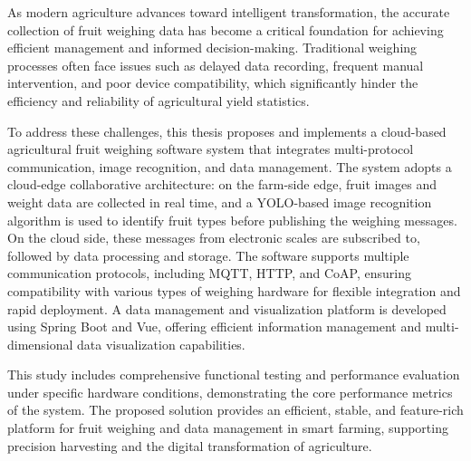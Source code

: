 As modern agriculture advances toward intelligent transformation, the accurate collection of fruit weighing data has become a critical foundation for achieving efficient management and informed decision-making. Traditional weighing processes often face issues such as delayed data recording, frequent manual intervention, and poor device compatibility, which significantly hinder the efficiency and reliability of agricultural yield statistics.

To address these challenges, this thesis proposes and implements a cloud-based agricultural fruit weighing software system that integrates multi-protocol communication, image recognition, and data management. The system adopts a cloud-edge collaborative architecture: on the farm-side edge, fruit images and weight data are collected in real time, and a YOLO-based image recognition algorithm is used to identify fruit types before publishing the weighing messages. On the cloud side, these messages from electronic scales are subscribed to, followed by data processing and storage. The software supports multiple communication protocols, including MQTT, HTTP, and CoAP, ensuring compatibility with various types of weighing hardware for flexible integration and rapid deployment. A data management and visualization platform is developed using Spring Boot and Vue, offering efficient information management and multi-dimensional data visualization capabilities.

This study includes comprehensive functional testing and performance evaluation under specific hardware conditions, demonstrating the core performance metrics of the system. The proposed solution provides an efficient, stable, and feature-rich platform for fruit weighing and data management in smart farming, supporting precision harvesting and the digital transformation of agriculture.